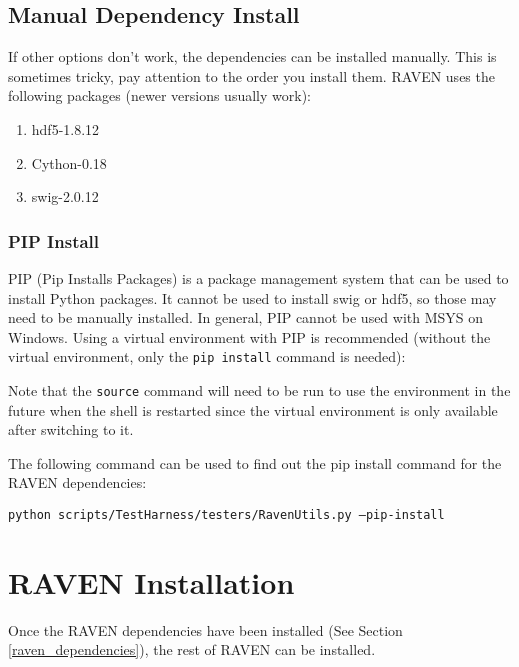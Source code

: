 \subsection{Manual Dependency Install}
\label{sysprep_manual}

If other options don't work, the dependencies can be installed
manually.  This is sometimes tricky, pay attention to the order you
install them.  RAVEN uses the following packages (newer versions
usually work):

\begin{enumerate}
  
\item hdf5-1.8.12
\item Cython-0.18
\item swig-2.0.12
\end{enumerate}

\goToRavenInstallation

\subsubsection{PIP Install}

PIP (Pip Installs Packages) is a package management system that can be
used to install Python packages.  It cannot be used to install swig or
hdf5, so those may need to be manually installed.  In general, PIP
cannot be used with MSYS on Windows.  Using a virtual environment with
PIP is recommended (without the virtual environment, only the
\texttt{pip install} command is needed):



Note that the \texttt{source} command will need to be run to use the
environment in the future when the shell is restarted since the
virtual environment is only available after switching to it.

The following command can be used to find out the pip install command
for the RAVEN dependencies:

\texttt{python scripts/TestHarness/testers/RavenUtils.py --pip-install}

\goToRavenInstallation


\section{RAVEN Installation}
\label{raven_installation}

Once the RAVEN dependencies have been installed (See Section
\ref{raven_dependencies}), the rest of RAVEN can be installed.

